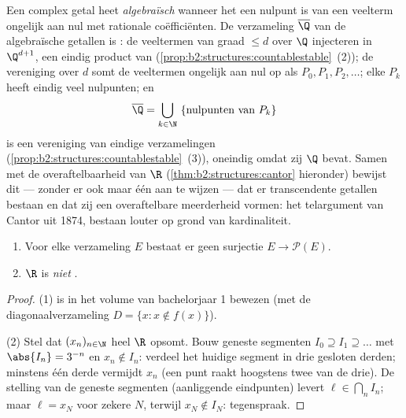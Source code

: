 \begin{example}\label{ex:b2:structures:algebraic}
Een complex getal heet \emph{algebraïsch} wanneer het een
nulpunt is van een veelterm ongelijk aan nul met rationale
coëfficiënten. De verzameling $\overline\Q$ van de algebraïsche
getallen is : de veeltermen van graad $\leq d$ over $\Q$
injecteren in $\Q^{d+1}$, een eindig product van 
(\cref{prop:b2:structures:countablestable}~(2)); de vereniging
over $d$ somt de veeltermen ongelijk aan nul op als $P_0, P_1,
P_2, \dots$; elke $P_k$ heeft eindig veel nulpunten; en
\[
\overline\Q = \bigcup_{k \in \N}\ \{\text{nulpunten van } P_k\}
\]
is een  vereniging van eindige verzamelingen
(\cref{prop:b2:structures:countablestable}~(3)), oneindig omdat
zij $\Q$ bevat. Samen met de overaftelbaarheid van $\R$
(\cref{thm:b2:structures:cantor} hieronder) bewijst dit ---
zonder er ook maar één aan te wijzen --- dat er transcendente
getallen bestaan en dat zij een overaftelbare meerderheid vormen:
het telargument van Cantor uit 1874, bestaan louter op grond van
kardinaliteit.
\end{example}

\begin{theorem}\label{thm:b2:structures:cantor}
\begin{enumerate}
  \item Voor elke verzameling $E$ bestaat er geen surjectie $E \to
        \mathcal{P}(E)$.
  \item $\R$ is \emph{niet} .
\end{enumerate}
\end{theorem}

\begin{proof}
(1) is in het volume van bachelorjaar 1 bewezen (met de
diagonaalverzameling $D = \{x : x \notin f(x)\}$).

(2) Stel dat $(x_n)_{n \in \N}$ heel $\R$ opsomt. Bouw
geneste segmenten $I_0 \supseteq I_1 \supseteq \dots$ met
$\abs{I_n} = 3^{-n}$ en $x_n \notin I_n$: verdeel het huidige
segment in drie gesloten derden; minstens één derde vermijdt $x_n$
(een punt raakt hoogstens twee van de drie). De stelling van de
geneste segmenten (aanliggende eindpunten) levert $\ell \in
\bigcap_n I_n$; maar $\ell = x_N$ voor zekere $N$, terwijl $x_N
\notin I_N$: tegenspraak.
\end{proof}

